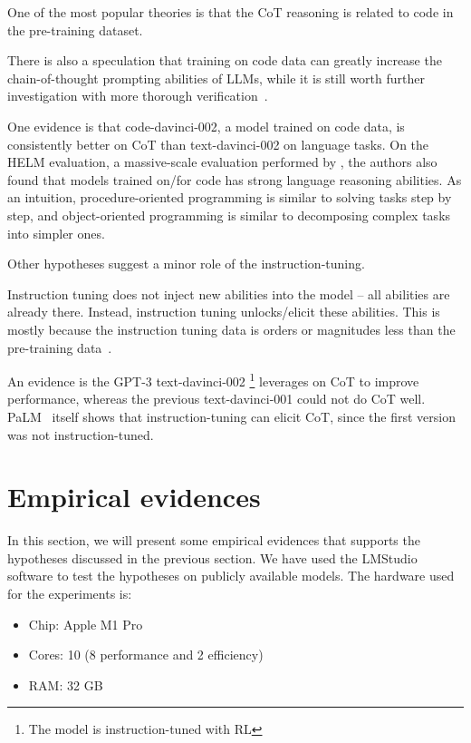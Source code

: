 One of the most popular theories is that the CoT reasoning is related to code in the pre-training dataset.
\begin{displayquote}
	There is also a speculation that training on code data can greatly increase the chain-of-thought prompting abilities of LLMs, while it is still worth further investigation with more thorough verification~\cite{survey}.
\end{displayquote}
One evidence is that code-davinci-002, a model trained on code data, is consistently better on CoT than text-davinci-002 on language tasks.
On the HELM evaluation, a massive-scale evaluation performed by \textcite{liang2022holistic}, the authors also found that models trained on/for code has strong language reasoning abilities.
As an intuition, procedure-oriented programming is similar to solving tasks step by step, and object-oriented programming is similar to decomposing complex tasks into simpler ones.

Other hypotheses suggest a minor role of the instruction-tuning.
\begin{displayquote}
	Instruction tuning does not inject new abilities into the model -- all abilities are already there.
	Instead, instruction tuning unlocks/elicit these abilities.
	This is mostly because the instruction tuning data is orders or magnitudes less than the pre-training data~\cite{fu2022gptroadmap}.
\end{displayquote}
An evidence is the GPT-3 text-davinci-002 \footnote{The model is instruction-tuned with RL} leverages on CoT to improve performance, whereas the previous text-davinci-001 could not do CoT well.
PaLM~\cite{chowdhery2022palm} itself shows that instruction-tuning can elicit CoT, since the first version was not instruction-tuned.

\section{Empirical evidences}
\label{sec:empirical-evidence}

In this section, we will present some empirical evidences that supports the hypotheses discussed in the previous section.
We have used the LMStudio\cite{lmstudio} software to test the hypotheses on publicly available models.
The hardware used for the experiments is:
\begin{itemize}
	\item Chip: Apple M1 Pro
	\item Cores: 10 (8 performance and 2 efficiency)
	\item RAM: 32 GB
\end{itemize}

